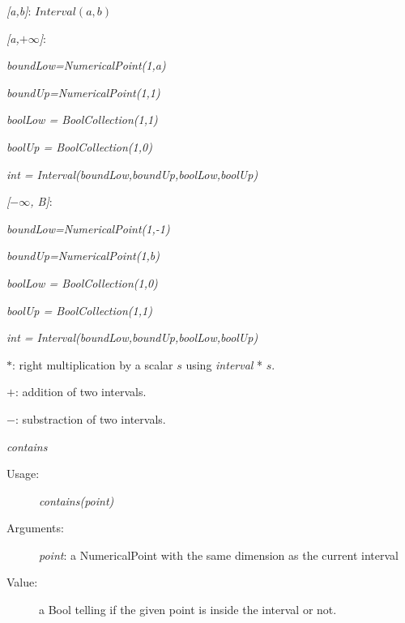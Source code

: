 \begin{description}
\item[Some Examples :] \rule{0pt}{1em}

\begin{description}

\item \textit{[a,b]}: $Interval(a,b)$

\item \textit{[a,$+\infty$]}:
\begin{description}
\item \textit{boundLow=NumericalPoint(1,a)}
\item \textit{boundUp=NumericalPoint(1,1)}
\item \textit{boolLow = BoolCollection(1,1)}
\item \textit{boolUp = BoolCollection(1,0)}
\item \textit{int = Interval(boundLow,boundUp,boolLow,boolUp)}
\end{description}
\bigskip


\item \textit{[$-\infty$, B]}:
\begin{description}
\item \textit{boundLow=NumericalPoint(1,-1)}
\item \textit{boundUp=NumericalPoint(1,b)}
\item \textit{boolLow = BoolCollection(1,0)}
\item \textit{boolUp = BoolCollection(1,1)}
\item \textit{int = Interval(boundLow,boundUp,boolLow,boolUp)}
\end{description}

\end{description}

\item[Some methods :]  \rule{0pt}{1em}

\begin{description}

\item $*$: right multiplication by a scalar $s$ using \textit{interval} * $s$.

\item $+$: addition of two intervals.
\item $-$: substraction of two intervals.

\item \textit{contains}
\begin{description}
\item[Usage:] \textit{contains(point)}
\item[Arguments:] \textit{point}: a NumericalPoint with the same dimension as the current interval
\item[Value:] a Bool telling if the given point is inside the interval or not.
\end{description}
\bigskip


\end{description}
\end{description}
